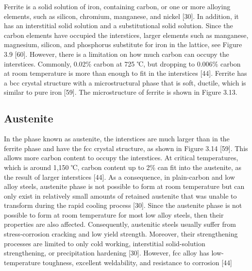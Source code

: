 \documentclass[12pt]{report}
\begin{document}

Ferrite is a solid solution of iron, containing carbon, or one or more alloying elements, such as silicon, chromium, manganese, and nickel [30]. In addition, it has an interstitial solid solution and a substitutional solid solution. Since the carbon elements have occupied the interstices, larger elements such as manganese, magnesium, silicon, and phosphorus substitute for iron in the lattice, see Figure 3.9 [60]. However, there is a limitation on how much carbon can occupy the interstices. Commonly, 0.02\% carbon at 725 ℃, but dropping to 0.006\% carbon at room temperature is more than enough to fit in the interstices [44]. Ferrite has a bcc crystal structure with a microstructural phase that is soft, ductile, which is similar to pure iron [59]. The microstructure of ferrite is shown in Figure 3.13.
 

\subsection{Austenite} 
In the phase known as austenite, the interstices are much larger than in the ferrite phase and have the fcc crystal structure, as shown in Figure 3.14 [59]. This allows more carbon content to occupy the interstices. At critical temperatures, which is around 1,150 ℃, carbon content up to 2\% can fit into the austenite, as the result of larger interstices [44]. As a consequence, in plain-carbon and low alloy steels, austenite phase is not possible to form at room temperature but can only exist in relatively small amounts of retained austenite that was unable to transform during the rapid cooling process [30].
Since the austenite phase is not possible to form at room temperature for most low alloy steels, then their properties are also affected. Consequently, austenitic steels usually suffer from stress-corrosion cracking and low yield strength. Moreover, their strengthening processes are limited to only cold working, interstitial solid-solution strengthening, or precipitation hardening [30]. However, fcc alloy has low-temperature toughness, excellent weldability, and resistance to corrosion [44]
 
\end{document}
